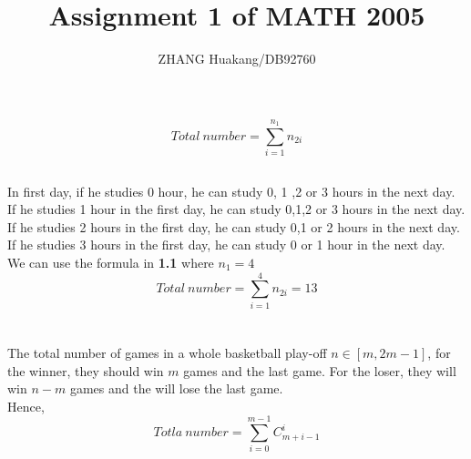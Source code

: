 \documentclass{article}
\title{Assignment 1 of MATH 2005}
\author{ZHANG Huakang/DB92760}
\begin{document}
    \maketitle
    \section{}
        \subsection{}
        
                $$Total \ number= \sum _{i=1}^{n_1}n_{2i}$$
            
        \subsection{}
                In first day, if he studies 0 hour, he can study 0, 1 ,2 or 3 hours in the  next day.
                \\
                If he studies 1 hour in the first day, he can study 0,1,2 or 3 hours in the next day.
                \\
                If he studies 2 hours in the first day, he can study 0,1 or 2 hours in the next day.
                \\
                If he studies 3 hours in the first day, he can study 0 or 1 hour in the next day.
                \\
                We can use the formula in \textbf{1.1} where $n_1=4$
                $$Total \ number= \sum _{i=1}^{4}n_{2i}=13$$
              

    \section{}
        \subsection{}
                The total number of games in a whole basketball play-off $ n\in [m,2m-1]$, for the winner, they should win $m$ games and the last game. For the loser, they will win $n-m$ games and the will lose the last game.
                \\
                Hence, 
                $$Totla\ number=\sum _{i=0} ^{m-1} C_{m+i-1} ^{i}$$
                
\end{document}
